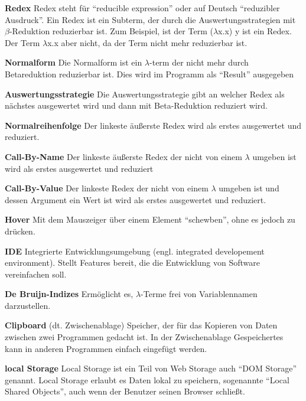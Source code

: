 \documentclass[parskip=full,11pt,twoside]{scrartcl}
\begin{document}
\textbf {Redex}
\newline
Redex steht für \enquote{reducible expression} oder auf Deutsch \enquote{reduzibler Ausdruck}. Ein Redex ist ein Subterm, der durch die Auswertungsstrategien mit $\beta$-Reduktion reduzierbar ist.
\newline
Zum Beispiel, ist der Term ($\lambda$x.x) y ist ein Redex. Der Term $\lambda$x.x aber nicht, da der Term nicht mehr reduzierbar ist.

\textbf{Normalform}
\newline
Die Normalform ist ein $\lambda$-term der nicht mehr durch Betareduktion reduzierbar ist. Dies wird im Programm als \enquote{Result} ausgegeben

\textbf{Auswertungsstrategie}
\newline
Die Auswertungsstrategie gibt an welcher Redex als nächstes ausgewertet wird und dann mit Beta-Reduktion reduziert wird.

\textbf{Normalreihenfolge}
\newline
Der linkeste äußerste Redex wird als erstes ausgewertet und reduziert.

\textbf{Call-By-Name}
\newline
Der linkeste äußerste Redex der nicht von einem $\lambda$ umgeben ist wird als erstes ausgewertet und reduziert

\textbf{Call-By-Value}
\newline
Der linkeste Redex der nicht von einem $\lambda$ umgeben ist und dessen Argument ein Wert ist wird als erstes ausgewertet und reduziert.

\textbf{Hover}
\newline
Mit dem Mauszeiger über einem Element \enquote{schewben}, ohne es jedoch zu drücken.

\textbf{IDE}
\newline
Integrierte Entwicklungsumgebung (engl. integrated developement environment). Stellt Features bereit, die die Entwicklung von Software vereinfachen soll.

\textbf{De Bruijn-Indizes}
\newline
Ermöglicht es, $\lambda$-Terme frei von Variablennamen darzustellen.

\textbf{Clipboard}
\newline
(dt. Zwischenablage) Speicher, der für das Kopieren von Daten zwischen zwei Programmen gedacht ist. In der Zwischenablage Gespeichertes kann in anderen Programmen einfach eingefügt werden.

\textbf{local Storage}
\newline
Local Storage ist ein Teil von Web Storage auch \enquote{DOM Storage} genannt. Local Storage erlaubt es Daten lokal zu speichern, sogenannte \enquote{Local Shared Objects}, auch wenn der Benutzer seinen Browser schließt.
\end{document}
